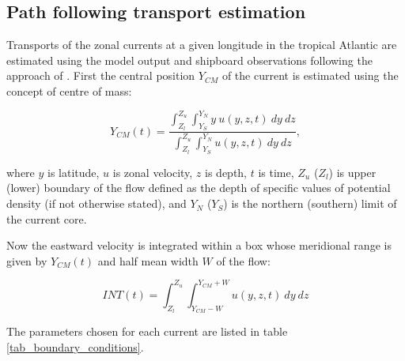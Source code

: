 \documentclass[os, manuscript]{copernicus}
\begin{document}
\subsection{Path following transport estimation}
Transports of the zonal currents at a given longitude in the tropical Atlantic are estimated using the model output and shipboard observations following the approach of \citet{Hsin2012}. First the central position $ Y_{CM} $ of the current is estimated using the concept of centre of mass:

\begin{equation}
	Y_{CM}(t) = \frac{\int_{Z_l}^{Z_u} \int_{Y_{S}}^{Y_{N}} y\ u(y,z,t)\ dy\ dz}{\int_{Z_l}^{Z_u} \int_{Y_{S}}^{Y_{N}} u(y,z,t)\ dy\ dz},
	\label{equ_Y_CM}
\end{equation}

where $y$ is latitude,  $u$ is zonal velocity, $z$ is depth, $t$ is time, $Z_u$ ($Z_l$) is upper (lower) boundary of the flow defined as the depth of specific values of potential density (if not otherwise stated), and $Y_N$ ($Y_S$) is the northern (southern) limit of the current core.

Now the eastward velocity is integrated within a box whose meridional range is given by $ Y_{CM}(t) $ and half mean width $ W $ of the flow:

\begin{equation}
	INT(t) = \int_{Z_l}^{Z_u} \int_{Y_{CM}-W}^{Y_{CM}+W} u(y,z,t)\ dy\ dz 
	\label{equ_INT}
\end{equation}

The parameters chosen for each current are listed in table \ref{tab_boundary_conditions}.
\end{document}
